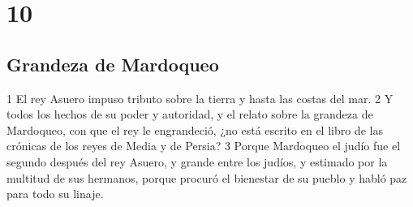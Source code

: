 \chapter{10}

\section*{Grandeza de Mardoqueo}

1 El rey Asuero impuso tributo sobre la tierra y hasta las costas del mar.
2 Y todos los hechos de su poder y autoridad, y el relato sobre la grandeza de Mardoqueo, con que el rey le engrandeció, ¿no está escrito en el libro de las crónicas de los reyes de Media y de Persia?
3 Porque Mardoqueo el judío fue el segundo después del rey Asuero, y grande entre los judíos, y estimado por la multitud de sus hermanos, porque procuró el bienestar de su pueblo y habló paz para todo su linaje.

